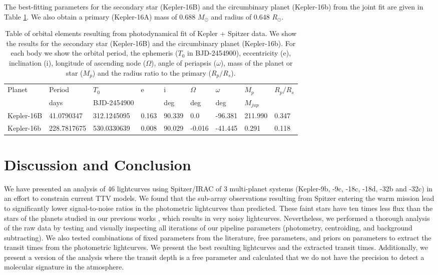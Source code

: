 The best-fitting parameters for the secondary star (Kepler-16B) and the circumbinary planet (Kepler-16b) from the joint fit are given in Table \ref{P4:tab:photodynamicresults}. We also obtain a primary (Kepler-16A) mass of 0.688 $M_\odot$ and radius of 0.648 $R_\odot$.

\begin{table}  \setlength{\tabcolsep}{2pt}

    \centering

    \caption{Table of orbital elements resulting from photodynamical fit of Kepler + Spitzer data. We show the results for the secondary star (Kepler-16B) and the circumbinary planet (Kepler-16b). For each body we show the orbital period, the ephemeris ($T_0$ in BJD-2454900), eccentricity (e), inclination (i), longitude of ascending node ($\Omega$), angle of periapsis ($\omega$), mass of the planet or star ($M_p$) and the radius ratio to the primary ($R_p/R_s$).}
    \label{P4:tab:photodynamicresults}
    \begin{tabular}{lllllllll}
\hline\hline
Planet & Period  & $T_0$ & e & i & $\Omega$ & $\omega$ & $M_p$ & $R_p/R_s$    \\
       & days & BJD-2454900 & & deg & deg & deg & $M_{jup}$ & \\
\hline
Kepler-16B	& 41.0790347 & 312.1245095 & 0.163 & 90.339	& 0.0	& -96.381	& 211.990	& 0.347  \\
Kepler-16b & 228.7817675 & 530.0330639 & 0.008 & 90.029 & -0.016 & -41.445 & 0.291 & 0.118  \\
\hline
    \end{tabular}

\end{table}



\section{Discussion and Conclusion}

We have presented an analysis of 46 lightcurves using Spitzer/IRAC of 3 multi-planet systems (Kepler-9b, -9c, -18c, -18d, -32b and -32c) in an effort to constrain current TTV models. We found that the sub-array observations resulting from Spitzer entering the warm mission lead to significantly lower signal-to-noise ratios in the photometric lightcurves than predicted. These faint stars have ten times less flux than the stars of the planets studied in our previous works \citep[e.g., see][]{Baxter2021}, which results in very noisy lightcurves. Nevertheless, we performed a thorough analysis of the raw data by testing and visually inspecting all iterations of our pipeline parameters (photometry, centroiding, and background subtracting). We also tested combinations of fixed parameters from the literature, free parameters, and priors on parameters to extract the transit times from the photometric lightcurves. We present the best resulting lightcurves and the extracted transit times. Additionally, we present a version of the analysis where the transit depth is a free parameter and calculated that we do not have the precision to detect a molecular signature in the atmosphere.

